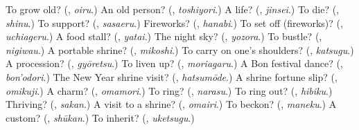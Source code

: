 \begin{tcolorbox}[breakable,colback=teal!4,colframe=teal!35!black,title={Before you move on}]
To grow old? (\textbf{}, \emph{oiru}.) An old person? (\textbf{}, \emph{toshiyori}.) A life? (\textbf{}, \emph{jinsei}.) To die? (\textbf{}, \emph{shinu}.) To support? (\textbf{}, \emph{sasaeru}.) Fireworks? (\textbf{}, \emph{hanabi}.) To set off (fireworks)? (\textbf{}, \emph{uchiageru}.) A food stall? (\textbf{}, \emph{yatai}.) The night sky? (\textbf{}, \emph{yozora}.) To bustle? (\textbf{}, \emph{nigiwau}.) A portable shrine? (\textbf{}, \emph{mikoshi}.) To carry on one's shoulders? (\textbf{}, \emph{katsugu}.) A procession? (\textbf{}, \emph{gyōretsu}.) To liven up? (\textbf{}, \emph{moriagaru}.) A Bon festival dance? (\textbf{}, \emph{bon'odori}.) The New Year shrine visit? (\textbf{}, \emph{hatsumōde}.) A shrine fortune slip? (\textbf{}, \emph{omikuji}.) A charm? (\textbf{}, \emph{omamori}.) To ring? (\textbf{}, \emph{narasu}.) To ring out? (\textbf{}, \emph{hibiku}.) Thriving? (\textbf{}, \emph{sakan}.) A visit to a shrine? (\textbf{}, \emph{omairi}.) To beckon? (\textbf{}, \emph{maneku}.) A custom? (\textbf{}, \emph{shūkan}.) To inherit? (\textbf{}, \emph{uketsugu}.)
\end{tcolorbox}

